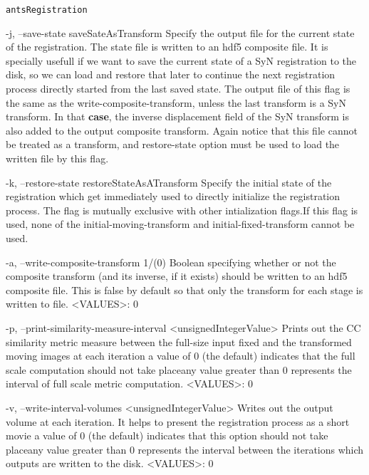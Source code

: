 \documentclass[ignorenonframetext,]{beamer}
\newenvironment{Shaded}{\begin{snugshade}}{\end{snugshade}}
\newcommand{\KeywordTok}[1]{\textcolor[rgb]{0.13,0.29,0.53}{\textbf{#1}}}
\newcommand{\FunctionTok}[1]{\textcolor[rgb]{0.00,0.00,0.00}{#1}}
\newcommand{\ExtensionTok}[1]{#1}
\newcommand{\NormalTok}[1]{#1}
\begin{document}
\begin{frame}[fragile]{\texttt{antsRegistration}}
\begin{Shaded}
\begin{Highlighting}[]
     \ExtensionTok{-j}\NormalTok{, --save-state saveSateAsTransform}
          \ExtensionTok{Specify}\NormalTok{ the output file for the current state of the registration. The state}
          \FunctionTok{file}\NormalTok{ is written to an hdf5 composite file. It is specially usefull if we want to}
          \ExtensionTok{save}\NormalTok{ the current state of a SyN registration to the disk, so we can load and}
          \ExtensionTok{restore}\NormalTok{ that later to continue the next registration process directly started}
          \ExtensionTok{from}\NormalTok{ the last saved state. The output file of this flag is the same as the}
          \ExtensionTok{write-composite-transform}\NormalTok{, unless the last transform is a SyN transform. In that}
          \KeywordTok{case}\NormalTok{, the inverse displacement field of the SyN transform is also added to the}
\NormalTok{          output composite transform. Again notice that this file cannot be treated as a}
\NormalTok{          transform, and restore-state option must be used to load the written file by}
\NormalTok{          this flag.}

\NormalTok{     -k, --restore-state restoreStateAsATransform}
\NormalTok{          Specify the initial state of the registration which get immediately used to}
\NormalTok{          directly initialize the registration process. The flag is mutually exclusive}
\NormalTok{          with other intialization flags.If this flag is used, none of the}
\NormalTok{          initial-moving-transform and initial-fixed-transform cannot be used.}

\NormalTok{     -a, --write-composite-transform 1/(0)}
\NormalTok{          Boolean specifying whether or not the composite transform (and its inverse, if}
\NormalTok{          it exists) should be written to an hdf5 composite file. This is false by default}
\NormalTok{          so that only the transform for each stage is written to file.}
\NormalTok{          <VALUES>: 0}

\NormalTok{     -p, --print-similarity-measure-interval <unsignedIntegerValue>}
\NormalTok{          Prints out the CC similarity metric measure between the full-size input fixed}
\NormalTok{          and the transformed moving images at each iteration a value of 0 (the default)}
\NormalTok{          indicates that the full scale computation should not take placeany value greater}
\NormalTok{          than 0 represents the interval of full scale metric computation.}
\NormalTok{          <VALUES>: 0}

\NormalTok{     -v, --write-interval-volumes <unsignedIntegerValue>}
\NormalTok{          Writes out the output volume at each iteration. It helps to present the}
\NormalTok{          registration process as a short movie a value of 0 (the default) indicates that}
\NormalTok{          this option should not take placeany value greater than 0 represents the}
\NormalTok{          interval between the iterations which outputs are written to the disk.}
\NormalTok{          <VALUES>: 0}


\end{Highlighting}
\end{Shaded}
\end{frame}
\end{document}
